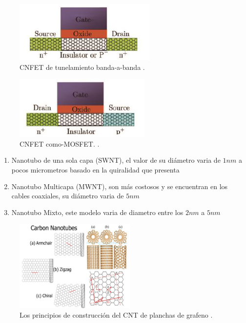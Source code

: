 \documentclass[conference]{IEEEtran} %
\begin{document}
\begin{figure}
	\centering
	\includegraphics[scale=0.7]{IMAGENES/img17}
	\caption{CNFET de tunelamiento banda-a-banda \cite{DesignofanovelternarySRAM2017}.}
	\label{img17}
\end{figure}

\begin{figure}
	\centering
	\includegraphics[scale=0.7]{IMAGENES/img18}
	\caption{CNFET como-MOSFET. \cite{DesignofanovelternarySRAM2017}.}
	\label{img18}
\end{figure}

\begin{enumerate}
	\item Nanotubo de una sola capa (SWNT), el valor de su diámetro varia de $1nm$ a pocos micrometros basado en la quiralidad que presenta\\
	\item Nanotubo Multicapa (MWNT), son más costosos y se encuentran en los cables coaxiales, su diámetro varia de $5nm$ \\
	\item Nanotubo Mixto, este modelo varia de diametro entre los $2nm$ a $5nm$
\end{enumerate}
	
	\begin{figure}
		\centering
		\includegraphics[width=6cm]{IMAGENES/img12}
		\caption{Los principios de construcción del CNT de planchas de grafeno \cite{PerformanceAnalysisofClassical2018} .}
		\label{img12}
	\end{figure}
	
\end{document}
